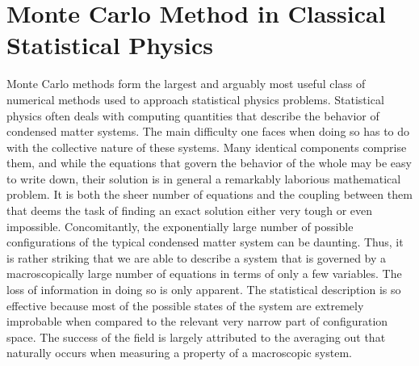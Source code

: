 \section{Monte Carlo Method in Classical  Statistical Physics}
\label{sec:classical_mc}

Monte Carlo methods form the largest and arguably most useful class of numerical methods used to approach statistical physics problems.
Statistical physics often deals with computing quantities that describe the behavior of condensed matter systems.
The main difficulty one faces when doing so has to do with the collective nature of these systems.
Many identical components comprise them, and while the equations that govern the behavior of the whole may be easy to write down, their solution is in general a remarkably laborious mathematical problem.
It is both the sheer number of equations and the coupling between them that deems the task of finding an exact solution either very tough or even impossible.
Concomitantly, the exponentially large number of possible configurations of the typical condensed matter system can be daunting.
Thus, it is rather striking that we are able to describe a system that is governed by a macroscopically large number of equations in terms of only a few variables.
The loss of information in doing so is only apparent.
The statistical description is so effective because most of the possible states of the system are extremely improbable when compared to the relevant very narrow part of configuration space.
The success of the field is largely attributed to the averaging out that naturally occurs when measuring a property of a macroscopic system.

